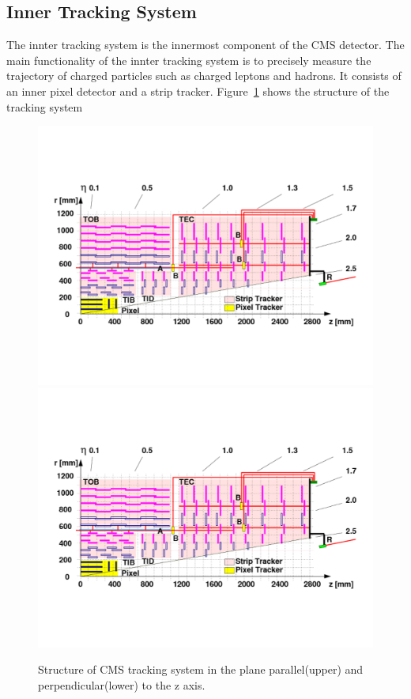 \subsection{Inner Tracking System} 
The innter tracking system\cite{lhc_trackerdesign} is the innermost component of the CMS detector. The main functionality of the innter tracking system is to precisely measure the trajectory of charged particles such as charged leptons and hadrons. It consists of an inner pixel detector and a strip tracker. Figure~\ref{fig:lhc_trackerbarrel} shows the structure of the tracking system
\begin{figure}[htbp]
\begin{center}
\includegraphics[width=0.7\linewidth, page=1]{figures/lhc_trackerbarrel.pdf}
\includegraphics[width=0.7\linewidth, page=2]{figures/lhc_trackerbarrel.pdf}
\caption{Structure of CMS tracking system in the plane parallel(upper) and perpendicular(lower) to the z axis.}
\label{fig:lhc_trackerbarrel}
\end{center}
\end{figure}

